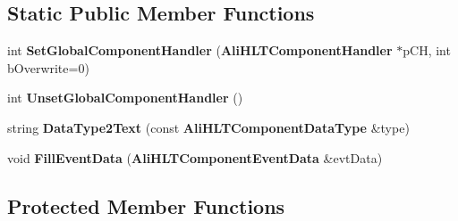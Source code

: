 \subsection*{Static Public Member Functions}
\begin{CompactItemize}
\item 
int {\bf Set\-Global\-Component\-Handler} ({\bf Ali\-HLTComponent\-Handler} $\ast$p\-CH, int b\-Overwrite=0)
\item 
int {\bf Unset\-Global\-Component\-Handler} ()
\item 
string {\bf Data\-Type2Text} (const {\bf Ali\-HLTComponent\-Data\-Type} \&type)
\item 
void {\bf Fill\-Event\-Data} ({\bf Ali\-HLTComponent\-Event\-Data} \&evt\-Data)
\end{CompactItemize}
\subsection*{Protected Member Functions}
